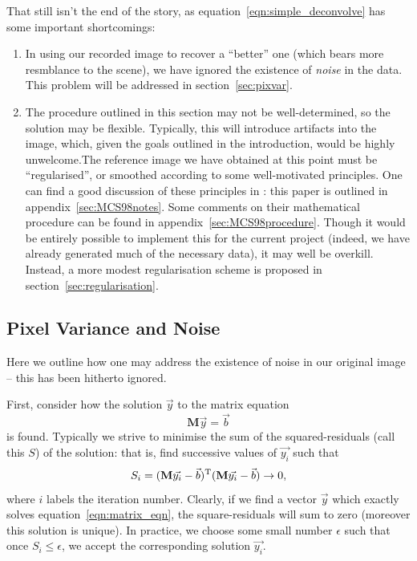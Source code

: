 \documentclass[letterpaper, 11pt]{article}
\def\ra{\ensuremath{\rightarrow}\xspace}
\begin{document}
That still isn't the end of the story, as equation~\ref{eqn:simple_deconvolve} has some important shortcomings:

\begin{enumerate}
	\item In using our recorded image to recover a ``better'' one (which bears more resmblance to the scene), we have ignored the existence of \emph{noise} in the data. This problem will be addressed in section~\vref{sec:pixvar}.
	
	\item The procedure outlined in this section may not be well-determined, so the solution may be flexible. Typically, this will introduce artifacts into the image, which, given the goals outlined in the introduction, would be highly unwelcome.\newline The reference image we have obtained at this point must be ``regularised'', or smoothed according to some well-motivated principles. One can find a good discussion of these principles in \citet{MCS98}: this paper is outlined in appendix~\ref{sec:MCS98notes}. Some comments on their mathematical procedure can be found in appendix~\ref{sec:MCS98procedure}. \newline Though it would be entirely possible to implement this for the current project (indeed, we have already generated much of the necessary data), it may well be overkill. Instead, a more modest regularisation scheme is proposed in section~\ref{sec:regularisation}.
\end{enumerate}




\subsection{Pixel Variance and Noise}
\label{sec:pixvar}

Here we outline how one may address the existence of noise in our original image -- this has been hitherto ignored.

First, consider how the solution $\vec y$ to the matrix equation
\begin{equation}
	\mathbf M \vec y = \vec b \label{eqn:matrix_eqn}
\end{equation}
is found. Typically we strive to minimise the sum of the squared-residuals (call this $S$) of the solution: that is, find successive values of $\vec {y_i}$ such that
\begin{equation} \label{eqn:sum_residuals}
	S_i = (\mathbf M \vec{y_i} - \vec b)^{\rm T}(\mathbf M \vec{y_i} - \vec b) \ra 0,
\end{equation}
where $i$ labels the iteration number. Clearly, if we find a vector $\vec y$ which exactly solves equation~\ref{eqn:matrix_eqn}, the square-residuals will sum to zero (moreover this solution is unique). In practice, we choose some small number $\epsilon$ such that once $S_i \leq \epsilon$, we accept the corresponding solution $\vec {y_i}$.
\end{document}
